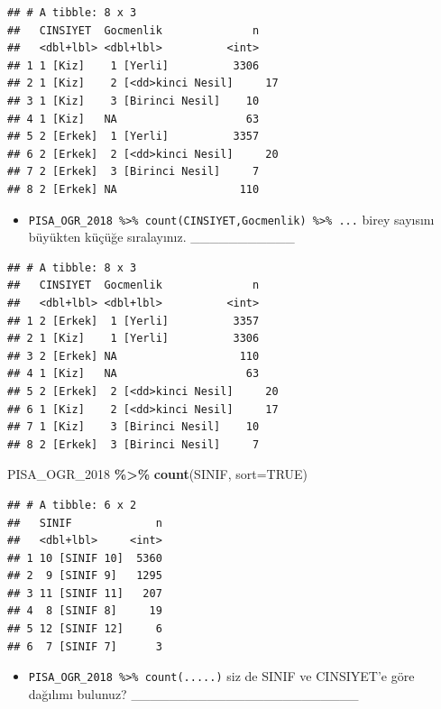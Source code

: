 \documentclass[
  oneside]{book}
\newenvironment{Shaded}{\begin{snugshade}}{\end{snugshade}}
\newcommand{\AttributeTok}[1]{\textcolor[rgb]{0.13,0.29,0.53}{#1}}
\newcommand{\ConstantTok}[1]{\textcolor[rgb]{0.56,0.35,0.01}{#1}}
\newcommand{\FunctionTok}[1]{\textcolor[rgb]{0.13,0.29,0.53}{\textbf{#1}}}
\newcommand{\NormalTok}[1]{#1}
\newcommand{\SpecialCharTok}[1]{\textcolor[rgb]{0.81,0.36,0.00}{\textbf{#1}}}
\providecommand{\tightlist}{%
  \setlength{\itemsep}{0pt}\setlength{\parskip}{0pt}}
\begin{document}
\begin{verbatim}
## # A tibble: 8 x 3
##   CINSIYET  Gocmenlik              n
##   <dbl+lbl> <dbl+lbl>          <int>
## 1 1 [Kiz]    1 [Yerli]          3306
## 2 1 [Kiz]    2 [<dd>kinci Nesil]     17
## 3 1 [Kiz]    3 [Birinci Nesil]    10
## 4 1 [Kiz]   NA                    63
## 5 2 [Erkek]  1 [Yerli]          3357
## 6 2 [Erkek]  2 [<dd>kinci Nesil]     20
## 7 2 [Erkek]  3 [Birinci Nesil]     7
## 8 2 [Erkek] NA                   110
\end{verbatim}

\begin{itemize}
\tightlist
\item
  \texttt{PISA\_OGR\_2018\ \%\textgreater{}\%\ count(CINSIYET,Gocmenlik)\ \%\textgreater{}\%\ ...} birey sayısını büyükten küçüğe sıralayınız.
  \_\_\_\_\_\_\_\_\_\_\_
\end{itemize}

\begin{verbatim}
## # A tibble: 8 x 3
##   CINSIYET  Gocmenlik              n
##   <dbl+lbl> <dbl+lbl>          <int>
## 1 2 [Erkek]  1 [Yerli]          3357
## 2 1 [Kiz]    1 [Yerli]          3306
## 3 2 [Erkek] NA                   110
## 4 1 [Kiz]   NA                    63
## 5 2 [Erkek]  2 [<dd>kinci Nesil]     20
## 6 1 [Kiz]    2 [<dd>kinci Nesil]     17
## 7 1 [Kiz]    3 [Birinci Nesil]    10
## 8 2 [Erkek]  3 [Birinci Nesil]     7
\end{verbatim}

\begin{Shaded}
\begin{Highlighting}[]
\NormalTok{PISA\_OGR\_2018 }\SpecialCharTok{\%\textgreater{}\%} \FunctionTok{count}\NormalTok{(SINIF, }\AttributeTok{sort=}\ConstantTok{TRUE}\NormalTok{)}
\end{Highlighting}
\end{Shaded}

\begin{verbatim}
## # A tibble: 6 x 2
##   SINIF             n
##   <dbl+lbl>     <int>
## 1 10 [SINIF 10]  5360
## 2  9 [SINIF 9]   1295
## 3 11 [SINIF 11]   207
## 4  8 [SINIF 8]     19
## 5 12 [SINIF 12]     6
## 6  7 [SINIF 7]      3
\end{verbatim}

\begin{itemize}
\tightlist
\item
  \texttt{PISA\_OGR\_2018\ \%\textgreater{}\%\ count(.....)} siz de SINIF ve CINSIYET'e göre dağılımı bulunuz? \_\_\_\_\_\_\_\_\_\_\_\_\_\_\_\_\_\_\_\_\_\_\_\_
\end{itemize}
\end{document}
